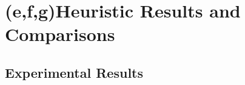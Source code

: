 
\section{(e,f,g)Heuristic Results and Comparisons}

\subsection{Experimental Results}
\newcommand{\ucstime}{21.9412 ms}
\newcommand{\ucsnode}{12907}
\newcommand{\ucslength}{179.66}
\newcommand{\ucscost}{106.6067}


\newcommand{\aStarHOnetime}{21.6008 ms}
\newcommand{\aStarHOnenode}{10374}
\newcommand{\aStarHOnelength}{0.000  \%}
\newcommand{\aStarHOnecost}{0.000 \%}

\newcommand{\aStarHTwotime}{2.9807 ms}
\newcommand{\aStarHTwonode}{460}
\newcommand{\aStarHTwolength}{-5.755  \%}
\newcommand{\aStarHTwocost}{23.6357 \%}

\newcommand{\aStarHThreetime}{0.9796 ms}
\newcommand{\aStarHThreenode}{217}
\newcommand{\aStarHThreelength}{-28.877 \%}
\newcommand{\aStarHThreecost}{36.2839 \%}

\newcommand{\aStarHFourtime}{1.8209 ms}
\newcommand{\aStarHFournode}{754}
\newcommand{\aStarHFourlength}{-16.932 \%}
\newcommand{\aStarHFourcost}{18.6720 \%}

\newcommand{\aStarHFivetime}{3.3776 ms}
\newcommand{\aStarHFivenode}{1660}
\newcommand{\aStarHFivelength}{-15.886 \%}
\newcommand{\aStarHFivecost}{9.1820 \%}


\newcommand{\aStarWeightedHOnetime}{23.4999 ms}
\newcommand{\aStarWeightedHOnenode}{9486}
\newcommand{\aStarWeightedHOnelength}{-1.747  \%}
\newcommand{\aStarWeightedHOnecost}{0.0662 \%}

\newcommand{\aStarWeightedHTwotime}{4.2639 ms}
\newcommand{\aStarWeightedHTwonode}{417}
\newcommand{\aStarWeightedHTwolength}{-4.386  \%}
\newcommand{\aStarWeightedHTwocost}{25.6196 \%}

\newcommand{\aStarWeightedHThreetime}{1.9081 ms}
\newcommand{\aStarWeightedHThreenode}{136}
\newcommand{\aStarWeightedHThreelength}{ -33.074 \%}
\newcommand{\aStarWeightedHThreecost}{47.9680 \%}

\newcommand{\aStarWeightedHFourtime}{1.4664 ms}
\newcommand{\aStarWeightedHFournode}{288}
\newcommand{\aStarWeightedHFourlength}{-30.669 \%}
\newcommand{\aStarWeightedHFourcost}{55.3635 \%}

\newcommand{\aStarWeightedHFivetime}{0.9395 ms}
\newcommand{\aStarWeightedHFivenode}{376}
\newcommand{\aStarWeightedHFivelength}{-22.821 \%}
\newcommand{\aStarWeightedHFivecost}{27.5237 \%}

